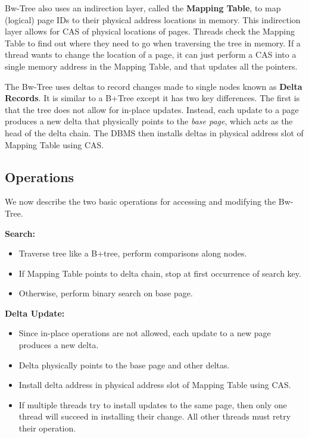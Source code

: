 \documentclass[11pt]{article}
\begin{document}
Bw-Tree also uses an indirection layer, called the \textbf{Mapping Table}, to map (logical) page IDs 
to their physical address locations in memory. This indirection layer allows for CAS of physical 
locations of pages. Threads check the Mapping Table to find out where they need to go when 
traversing the tree in memory.  If a thread wants to change the location of a page, it can just 
perform a CAS into a single memory address in the Mapping Table, and that updates all the pointers.

The Bw-Tree uses deltas to record changes made to single nodes known as 
\textbf{Delta Records}. It is similar to a B+Tree except it has two key differences. The first is 
that the tree does not allow for in-place updates. Instead, each update to 
a page produces a new delta that physically points to the \textit{base page}, which acts as the 
head of the delta chain. The DBMS then installs deltas in physical address slot of Mapping Table 
using CAS.

\subsection*{Operations}
We now describe the two basic operations for accessing and modifying the Bw-Tree.

\textbf{Search:}
\begin{itemize}
    \item
    Traverse tree like a B+tree, perform comparisons along nodes.
    
    \item
    If Mapping Table points to delta chain, stop at first occurrence of search key.
    
    \item
    Otherwise, perform binary search on base page.
\end{itemize}

\textbf{Delta Update:}
\begin{itemize}
    \item
    Since in-place operations are not allowed, each update to a new page produces a new delta.
    
    \item
    Delta physically points to the base page and other deltas.
    
    \item
    Install delta address in physical address slot of Mapping Table using CAS.
    
    \item
    If multiple threads try to install updates to the same 
    page, then only one thread will succeed in installing their change. All other threads must 
    retry their operation.
\end{itemize}
\end{document}
